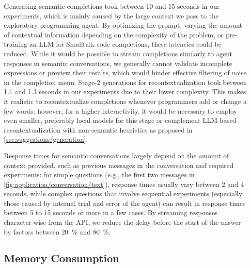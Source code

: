 Generating semantic completions took between 10 and 15 seconds in our experiments, which is mainly caused by the large context we pass to the exploratory programming agent.
By optimizing the prompt, varying the amount of contextual information depending on the complexity of the problem, or pre-training an LLM for Smalltalk code completions, these latencies could be reduced.
While it would be possible to stream completions similarly to agent responses in semantic conversations, we generally cannot validate incomplete expressions or preview their results, which would hinder effective filtering of noise in the completion menu.
Stage-2 generations for recontextualization took between 1.1 and 1.3 seconds in our experiments due to their lower complexity.
This makes it realistic to recontextualize completions whenever programmers add or change a few words; however, for a higher interactivity, it would be necessary to employ even smaller, preferably local models for this stage or complement LLM-based recontextualization with non-semantic heuristics as proposed in \cref{sec:suggestions/generation}.

Response times for semantic conversations largely depend on the amount of context provided, such as previous messages in the conversation and required experiments:
for simple questions (e.g., the first two messages in \cref{fig:application/conversation/text}), response times usually vary between 2 and 4 seconds, while complex questions that involve sequential experiments (especially those caused by internal trial and error of the agent) can result in response times between 5 to 15 seconds or more in a few cases.
By streaming responses character-wise from the API, we reduce the delay before the start of the answer by factors between \qty{20}{\percent} and \qty{80}{\percent}.

\subsection*{Memory Consumption}
\label{sec:discussion/performance/memory}

